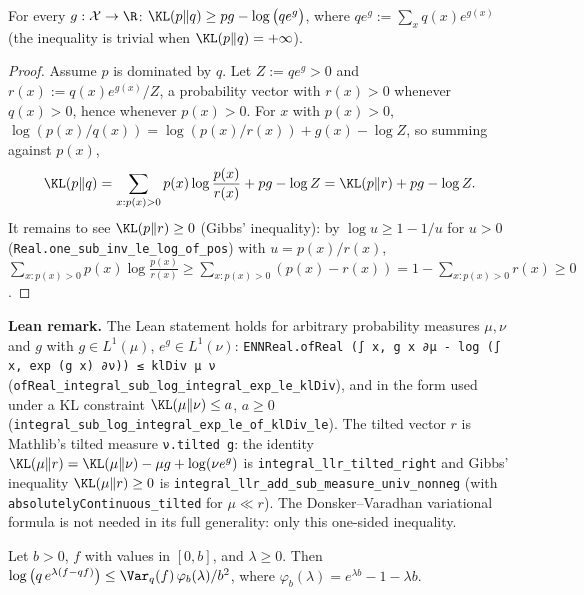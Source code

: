 \begin{lemma}\label{lem:donsker_varadhan_finite}
\leanok
For every $g : \mathcal X \to \R$: $\KL(p \| q) \ge pg - \log\big(q e^{g}\big)$, where
$q e^g := \sum_x q(x) e^{g(x)}$ (the inequality is trivial when $\KL(p\|q) = +\infty$).
\end{lemma}

\begin{proof}
\leanok
Assume $p$ is dominated by $q$. Let $Z := q e^g > 0$ and $r(x) := q(x) e^{g(x)}/Z$, a probability
vector with $r(x) > 0$ whenever $q(x) > 0$, hence whenever $p(x) > 0$. For $x$ with $p(x) > 0$,
$\log(p(x)/q(x)) = \log(p(x)/r(x)) + g(x) - \log Z$, so summing against $p(x)$,
\[
  \KL(p \| q) = \sum_{x : p(x) > 0} p(x)\log\frac{p(x)}{r(x)} + pg - \log Z = \KL(p \| r) + pg - \log Z .
\]
It remains to see $\KL(p \| r) \ge 0$ (Gibbs' inequality): by $\log u \ge 1 - 1/u$ for $u > 0$
(\texttt{Real.one\_sub\_inv\_le\_log\_of\_pos}) with $u = p(x)/r(x)$,
$\sum_{x : p(x) > 0} p(x)\log\frac{p(x)}{r(x)} \ge \sum_{x : p(x) > 0} (p(x) - r(x)) = 1 - \sum_{x : p(x) > 0} r(x) \ge 0$.
\end{proof}

\textbf{Lean remark.} The Lean statement holds for arbitrary probability measures $\mu, \nu$
and $g$ with $g \in L^1(\mu)$, $e^g \in L^1(\nu)$:
\texttt{ENNReal.ofReal (∫ x, g x ∂μ - log (∫ x, exp (g x) ∂ν)) ≤ klDiv μ ν}
(\texttt{ofReal\_integral\_sub\_log\_integral\_exp\_le\_klDiv}), and in the form used under a KL
constraint $\KL(\mu\|\nu) \le a$, $a \ge 0$ (\texttt{integral\_sub\_log\_integral\_exp\_le\_of\_klDiv\_le}).
The tilted vector $r$ is Mathlib's tilted measure \texttt{ν.tilted g}: the identity
$\KL(\mu\|r) = \KL(\mu\|\nu) - \mu g + \log(\nu e^g)$ is \texttt{integral\_llr\_tilted\_right} and
Gibbs' inequality $\KL(\mu \| r) \ge 0$ is \texttt{integral\_llr\_add\_sub\_measure\_univ\_nonneg}
(with \texttt{absolutelyContinuous\_tilted} for $\mu \ll r$). The Donsker--Varadhan variational
formula is not needed in its full generality: only this one-sided inequality.

\begin{lemma}\label{lem:bernstein_mgf_bounded}
\leanok
Let $b > 0$, $f$ with values in $[0, b]$, and $\lambda \ge 0$. Then
$\log\big(q\, e^{\lambda(f - qf)}\big) \le \Var_q(f)\, \varphi_b(\lambda)/b^2$,
where $\varphi_b(\lambda) = e^{\lambda b} - 1 - \lambda b$.
\end{lemma}

